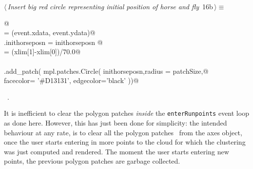 \documentclass[11.5pt]{report}
\begin{document}
\vspace{-0.8cm} \newchunk
\begin{flushleft} \small
\begin{minipage}{\linewidth}\label{scrap9}\raggedright\small
{} $\langle\,${\itshape Insert big red circle representing initial position of horse and fly}\nobreak\ {\footnotesize {16b}}$\,\rangle\equiv$
\vspace{-1ex}
\begin{list}{}{} \item
\mbox{}\verb@ @\\
\mbox{}\verb@inithorseposn     = (event.xdata, event.ydata)@\\
\mbox{}\verb@run.inithorseposn = inithorseposn  @\\
\mbox{}\verb@patchSize         = (xlim[1]-xlim[0])/70.0@\\
\mbox{}\verb@@\\
\mbox{}\verb@ax.add_patch( mpl.patches.Circle( inithorseposn,radius = patchSize,@\\
\mbox{}\verb@                                  facecolor= '#D13131', edgecolor='black' ))@\\
\mbox{}\verb@@{\NWsep}
\end{list}
\vspace{-1.5ex}
\footnotesize
\begin{list}{}{\setlength{\itemsep}{-\parsep}\setlength{\itemindent}{-\leftmargin}}
\item \NWtxtMacroRefIn\ .

\item{}
\end{list}
\end{minipage}\vspace{4ex}
\end{flushleft}



\vspace{-0.8cm} \newchunk   
 It is inefficient to clear the polygon patches \textit{inside} the
 \verb|enterRunpoints| event loop as done here. However, this has just been done for 
 simplicity: the intended behaviour at any rate, is to clear all the polygon patches \
 from the axes object, once the user starts entering in more points to the cloud
 for which the clustering was just computed and rendered. The moment the user starts 
 entering new points, the previous polygon patches are garbage collected. 
\end{document}
